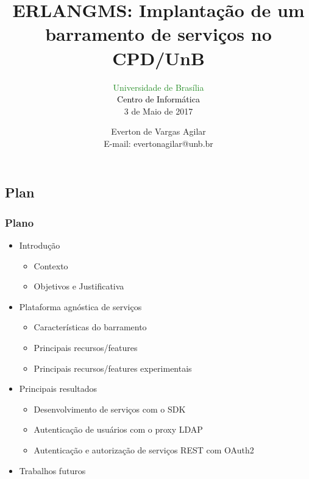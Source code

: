 \documentclass{beamer}
\title{ERLANGMS: Implantação de um barramento de serviços no CPD/UnB}
\subtitle{ \textcolor{forestgreen}{Universidade de Brasília} \\
			\textcolor{black}{Centro de Informática} \\
			3 de Maio de 2017
}
\author{Everton de Vargas Agilar \\
		E-mail: evertonagilar@unb.br
}
\begin{document}
\begin{frame}
  \titlepage
\end{frame}








\subsection{Plan}

\begin{frame}
  \frametitle{Plano}

    \begin{itemize}

	    \item<1-> Introdução
		    \begin{itemize}
		  	  \item<1->Contexto
		    	  \item<1->Objetivos e Justificativa
		     \end{itemize}

		 \item<1-> Plataforma agnóstica de serviços
		    \begin{itemize}
				\item<1->Características do barramento
				\item<1->Principais recursos/features
				\item<1->Principais recursos/features experimentais
		     \end{itemize}

  	  	 \item<1-> Principais resultados
		    \begin{itemize}
				\item<1->Desenvolvimento de serviços com o SDK
				\item<1->Autenticação de usuários com o proxy LDAP
				\item<1->Autenticação e autorização de serviços REST com OAuth2
  		     \end{itemize}
  	  
	   	  \item<1-> Trabalhos futuros
	   	  
    \end{itemize}

\end{frame}




\end{document}
